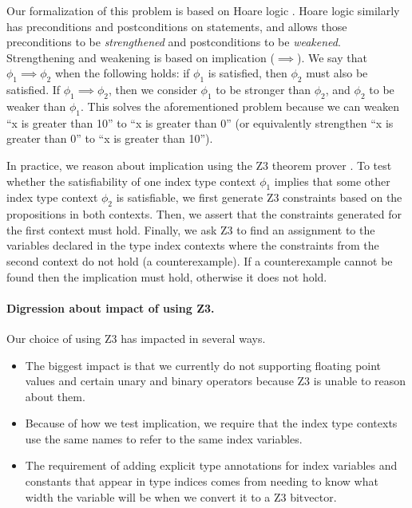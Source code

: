 Our formalization of this problem is based on Hoare logic .
Hoare logic similarly has preconditions and postconditions on statements, and allows those preconditions to be \emph{strengthened} and postconditions to be \emph{weakened}.
Strengthening and weakening is based on implication ($\implies$).
We say that $\phi_1 \implies \phi_2$ when the following holds: if $\phi_1$ is satisfied, then $\phi_2$ must also be satisfied.
If $\phi_1 \implies \phi_2$, then we consider $\phi_1$ to be stronger than $\phi_2$, and $\phi_2$ to be weaker than $\phi_1$.
This solves the aforementioned problem because we can weaken ``x is greater than 10'' to ``x is greater than 0'' (or equivalently strengthen ``x is greater than 0'' to ``x is greater than 10'').

In practice, we reason about implication using the Z3 theorem prover .
To test whether the satisfiability of one index type context $\phi_1$ implies that some other index type context $\phi_2$ is satisfiable, we first generate Z3 constraints based on the propositions in both contexts.
Then, we assert that the constraints generated for the first context must hold.
Finally, we ask Z3 to find an assignment to the variables declared in the type index contexts where the constraints from the second context do not hold (a counterexample).
If a counterexample cannot be found then the implication must hold, otherwise it does not hold.

\paragraph{Digression about impact of using Z3.}
Our choice of using Z3 has impacted \name in several ways.
\begin{itemize}
    \item The biggest impact is that we currently do not supporting floating point values and certain unary and binary operators because Z3 is unable to reason about them.
    \item Because of how we test implication, we require that the index type contexts use the same names to refer to the same index variables.
    \item The requirement of adding explicit type annotations for index variables and constants that appear in type indices comes from needing to know what width the variable will be when we convert it to a Z3 bitvector.
\end{itemize}

